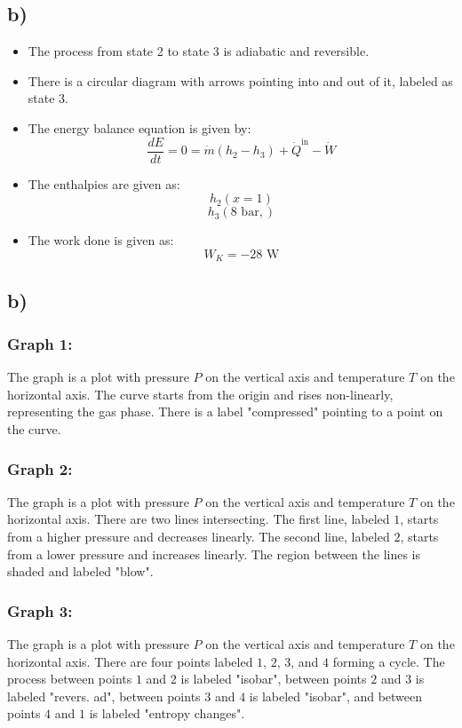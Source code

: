 

\subsection*{b)}

\begin{itemize}
    \item The process from state 2 to state 3 is adiabatic and reversible.
    \item There is a circular diagram with arrows pointing into and out of it, labeled as state 3.
    \item The energy balance equation is given by:
    \[
    \frac{dE}{dt} = 0 = \dot{m}(h_2 - h_3) + \dot{Q}^{\text{in}} - \dot{W}
    \]
    \item The enthalpies are given as:
    \[
    h_2 \left( x = 1 \right)
    \]
    \[
    h_3 \left( 8 \text{ bar}, \right)
    \]
    \item The work done is given as:
    \[
    W_K = -28 \text{ W}
    \]
\end{itemize}



\subsection*{b)}
\subsubsection*{Graph 1:}
The graph is a plot with pressure \(P\) on the vertical axis and temperature \(T\) on the horizontal axis. The curve starts from the origin and rises non-linearly, representing the gas phase. There is a label "compressed" pointing to a point on the curve.

\subsubsection*{Graph 2:}
The graph is a plot with pressure \(P\) on the vertical axis and temperature \(T\) on the horizontal axis. There are two lines intersecting. The first line, labeled \(1\), starts from a higher pressure and decreases linearly. The second line, labeled \(2\), starts from a lower pressure and increases linearly. The region between the lines is shaded and labeled "blow".

\subsubsection*{Graph 3:}
The graph is a plot with pressure \(P\) on the vertical axis and temperature \(T\) on the horizontal axis. There are four points labeled \(1\), \(2\), \(3\), and \(4\) forming a cycle. The process between points \(1\) and \(2\) is labeled "isobar", between points \(2\) and \(3\) is labeled "revers. ad", between points \(3\) and \(4\) is labeled "isobar", and between points \(4\) and \(1\) is labeled "entropy changes".